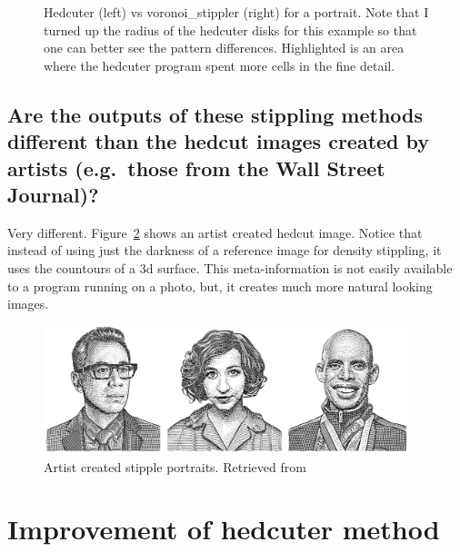 \documentclass[11pt]{article}
\begin{document}
\begin{figure}[H]
  \centering
  \begin{minipage}{.5\textwidth}
    \centering
    
  \end{minipage}%
  \begin{minipage}{.5\textwidth}
    \centering
    
  \end{minipage}
  \caption{Hedcuter (left) vs voronoi\_stippler (right) for a
    portrait. Note that I turned up the radius of the hedcuter disks
    for this example so that one can better see the pattern
    differences. Highlighted is an area where the hedcuter program
    spent more cells in the fine detail.}\label{c3}
\end{figure}

\subsection{Are the outputs of these stippling methods different than
  the hedcut images created by artists (e.g.\ those from the Wall
  Street Journal)?}

Very different. Figure~\ref{faces} shows an artist created hedcut
image. Notice that instead of using just the darkness of a reference
image for density stippling, it uses the countours of a 3d
surface. This meta-information is not easily available to a program
running on a photo, but, it creates much more natural looking images.

\begin{figure}[H]
  \centering
  \begin{minipage}{1\textwidth}
    \centering
    \includegraphics[width=0.95\textwidth]{faces.jpg}
  \end{minipage}
  \caption{Artist created stipple portraits. Retrieved
    from~\cite{facesimg}}\label{faces}
\end{figure}


\section{Improvement of hedcuter method}
\end{document}
